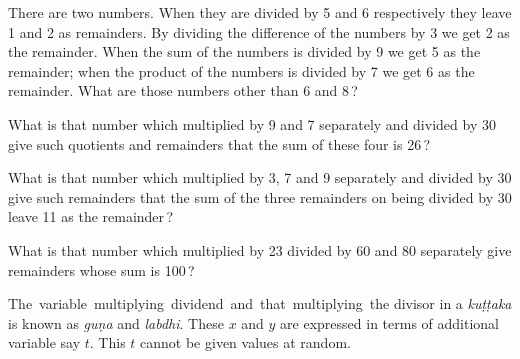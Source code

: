 \documentclass[]{article}
\begin{document}
There are two numbers. When they are divided by 5 and 6 respectively
they leave 1 and 2 as remainders. By dividing the difference of the
numbers by 3 we get 2 as the remainder. When the sum of the numbers is
divided by 9 we get 5 as the remainder; when the product of the numbers
is divided by 7 we get 6 as the remainder. What are those numbers other
than 6 and 8\,?

\newpage
\large

\begin{quote}  {
}  \end{quote}

{What is that number which multiplied by 9 and 7 separately and divided
by 30 give such quotients and remainders that the sum of these four is
26\,?}

\begin{quote}  {
}  \end{quote}

{What is that number which multiplied by 3, 7 and 9 separately and
divided by 30 give such remainders that the sum of the three remainders
on being divided by 30 leave 11 as the remainder\,?}

\begin{quote}  {
}  \end{quote}

{What is that number which multiplied by 23 divided by 60 and 80
separately give remainders whose sum is 100\,?}

\begin{quote}  {
}  \end{quote}

{The \,variable \,multiplying \,dividend \,and \,that \,multiplying \,the divisor in a \textit{kuṭṭaka} is known as \textit{guṇa} and \textit{labdhi}. These $x$ and $y$ are expressed in terms of additional variable say $t$. This $t$ cannot be given values at random. }
\end{document}
